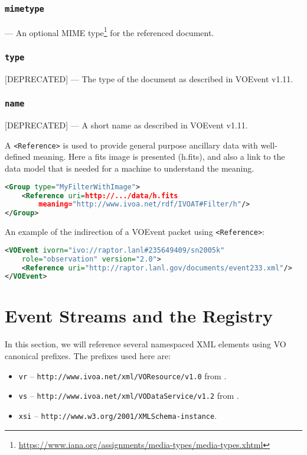 \documentclass[11pt,a4paper]{ivoa}
\begin{document}
\subsubsection{\texttt{mimetype}}\label{sec:3.9.3}--- An optional MIME type\footnote{
\url{https://www.iana.org/assignments/media-types/media-types.xhtml}} for the 
referenced document. 
\subsubsection{\texttt{type}}\label{sec:3.9.4}[DEPRECATED] --- The type of the 
document as described in VOEvent v1.11. 
\subsubsection{\texttt{name}}\label{sec:3.9.5}[DEPRECATED] --- A short name as 
described in VOEvent v1.11. 

A \texttt{<Reference>} is used to provide general purpose ancillary data with 
well-defined meaning. Here a fits image is presented (h.fits), and also a link 
to the data model that is needed for a machine to understand the meaning. 
\begin{lstlisting}[language=XML]
<Group type="MyFilterWithImage">
    <Reference uri=http://.../data/h.fits
        meaning="http://www.ivoa.net/rdf/IVOAT#Filter/h"/>
</Group>
\end{lstlisting}
An example of the indirection of a VOEvent packet using \texttt{<Reference>}:  
\begin{lstlisting}[language=XML]
<VOEvent ivorn="ivo://raptor.lanl#235649409/sn2005k" 
    role="observation" version="2.0">   
    <Reference uri="http://raptor.lanl.gov/documents/event233.xml"/>
</VOEvent>
\end{lstlisting}

\section{Event Streams and the Registry}
\label{sec:registry-matters}

In this section, we will reference several namespaced XML elements using
VO canonical prefixes.  The prefixes used here are:

\begin{itemize}
\item \verb|vr| -- \nolinkurl{http://www.ivoa.net/xml/VOResource/v1.0}
from \citet{2018ivoa.spec.0625P}.
\item \verb|vs| --
\nolinkurl{http://www.ivoa.net/xml/VODataService/v1.2}
from \citet{2021ivoa.spec.1102D}.
\item \verb|xsi| --
\nolinkurl{http://www.w3.org/2001/XMLSchema-instance}.
\end{itemize}
\end{document}
